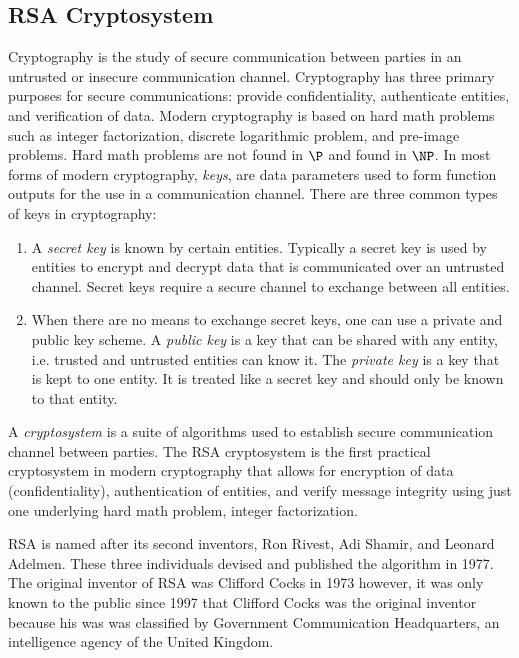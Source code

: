 \documentclass[10pt]{CSUNthesis}
\theoremstyle{plain}%
\theoremstyle{definition}
\theoremstyle{remark}
\begin{document}
\subsection{RSA Cryptosystem}
Cryptography is the study of secure communication between parties in an untrusted or insecure communication channel.
Cryptography has three primary purposes for secure communications: provide confidentiality, authenticate entities, and verification of data.
Modern cryptography is based on hard math problems such as integer factorization, discrete logarithmic problem, and pre-image problems. 
Hard math problems are not found in $\P$ and found in $\NP$.
In most forms of modern cryptography, \textit{keys}, are data parameters used to form function outputs for the use in a communication channel.
There are three common types of keys in cryptography:
\begin{enumerate}
\item A \textit{secret key} is known by certain entities.  Typically a secret key is used by entities to encrypt and decrypt data that is communicated over an untrusted channel.  Secret keys require a secure channel to exchange between all entities.
\item When there are no means to exchange secret keys, one can use a private and public key scheme.
A \textit{public key} is a key that can be shared with any entity, i.e. trusted and untrusted entities can know it.
The \textit{private key} is a key that is kept to one entity. It is treated like a secret key and should only be known to that entity.
\end{enumerate}
A \textit{cryptosystem} is a suite of algorithms used to establish secure communication channel between parties. 
The RSA cryptosystem is the first practical cryptosystem in modern cryptography that allows for encryption of data (confidentiality), authentication of entities, and verify message integrity using just one underlying hard math problem, integer factorization.

RSA is named after its second inventors, Ron Rivest, Adi Shamir, and Leonard Adelmen.
These three individuals devised and published the algorithm in 1977.
The original inventor of RSA was Clifford Cocks in 1973 however, it was only known to the public since 1997 that Clifford Cocks was the original inventor because his was was classified by Government Communication Headquarters, an intelligence agency of the United Kingdom.
\end{document}
